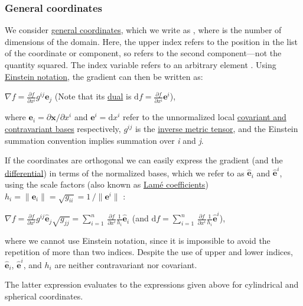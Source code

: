 \documentclass[
]{article}
\begin{document}
\hypertarget{general_coordinates}{%
\subsubsection{General coordinates}\label{general_coordinates}}

We consider \href{Curvilinear_coordinates}{general coordinates}, which
we write as , where is the number of dimensions of the domain. Here, the
upper index refers to the position in the list of the coordinate or
component, so refers to the second component---not the quantity squared.
The index variable refers to an arbitrary element . Using
\href{Einstein_notation}{Einstein notation}, the gradient can then be
written as:

\(\nabla f = \frac{\partial f}{\partial x^{i}}g^{ij} \mathbf{e}_j\)
(Note that its \href{Dual_space}{dual} is
\(\mathrm{d}f = \frac{\partial f}{\partial x^{i}}\mathbf{e}^i\)),

where \(\mathbf{e}_i = \partial \mathbf{x}/\partial x^i\) and
\(\mathbf{e}^i = \mathrm{d}x^i\) refer to the unnormalized local
\href{Curvilinear_coordinates\#Covariant_and_contravariant_bases}{covariant
and contravariant bases} respectively, \(g^{ij}\) is the
\href{Metric_tensor\#Inverse_metric}{inverse metric tensor}, and the
Einstein summation convention implies summation over \emph{i} and
\emph{j}.

If the coordinates are orthogonal we can easily express the gradient
(and the \href{Differential_form}{differential}) in terms of the
normalized bases, which we refer to as \(\hat{\mathbf{e}}_i\) and
\(\hat{\mathbf{e}}^i\), using the scale factors (also known as
\href{Lamé_coefficients}{Lamé coefficients})
\(h_i= \lVert \mathbf{e}_i \rVert = \sqrt{g_{i i}} = 1\, / \lVert \mathbf{e}^i \rVert\)
:

\(\nabla f = \frac{\partial f}{\partial x^{i}}g^{ij} \hat{\mathbf{e}}_{j}\sqrt{g_{jj}} = \sum_{i=1}^n \, \frac{\partial f}{\partial x^{i}} \frac{1}{h_i} \mathbf{\hat{e}}_i\)
(and
\(\mathrm{d}f = \sum_{i=1}^n \, \frac{\partial f}{\partial x^{i}} \frac{1}{h_i} \mathbf{\hat{e}}^i\)),

where we cannot use Einstein notation, since it is impossible to avoid
the repetition of more than two indices. Despite the use of upper and
lower indices, \(\mathbf{\hat{e}}_i\), \(\mathbf{\hat{e}}^i\), and
\(h_i\) are neither contravariant nor covariant.

The latter expression evaluates to the expressions given above for
cylindrical and spherical coordinates.
\end{document}
